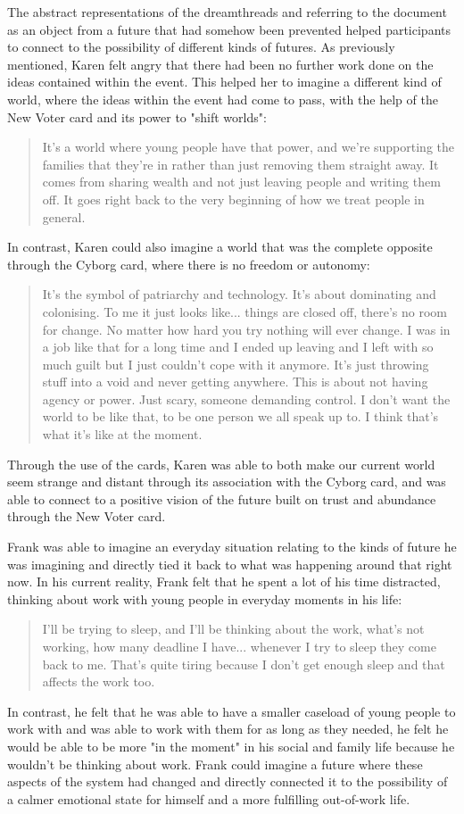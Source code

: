 The abstract representations of the dreamthreads and referring to the document as an object from a future that had somehow been prevented helped participants to connect to the possibility of different kinds of futures. As previously mentioned, Karen felt angry that there had been no further work done on the ideas contained within the event. This helped her to imagine a different kind of world, where the ideas within the event had come to pass, with the help of the New Voter card and its power to "shift worlds":
\begin{quote}
It's a world where young people have that power, and we're supporting the families that they're in rather than just removing them straight away. It comes from sharing wealth and not just leaving people and writing them off. It goes right back to the very beginning of how we treat people in general.
\end{quote}
In contrast, Karen could also imagine a world that was the complete opposite through the Cyborg card, where there is no freedom or autonomy:
\begin{quote}
It's the symbol of patriarchy and technology. It's about dominating and colonising. To me it just looks like... things are closed off, there's no room for change. No matter how hard you try nothing will ever change. I was in a job like that for a long time and I ended up leaving and I left with so much guilt but I just couldn't cope with it anymore. It's just throwing stuff into a void and never getting anywhere. This is about not having agency or power. Just scary, someone demanding control. I don't want the world to be like that, to be one person we all speak up to. I think that's what it's like at the moment.
\end{quote}
Through the use of the cards, Karen was able to both make our current world seem strange and distant through its association with the Cyborg card, and was able to connect to a positive vision of the future built on trust and abundance through the New Voter card.

Frank was able to imagine an everyday situation relating to the kinds of future he was imagining and directly tied it back to what was happening around that right now. In his current reality, Frank felt that he spent a lot of his time distracted, thinking about work with young people in everyday moments in his life:
\begin{quote}
I'll be trying to sleep, and I'll be thinking about the work, what's not working, how many deadline I have... whenever I try to sleep they come back to me. That's quite tiring because I don't get enough sleep and that affects the work too. 
\end{quote}
In contrast, he felt that he was able to have a smaller caseload of young people to work with and was able to work with them for as long as they needed, he felt he would be able to be more "in the moment" in his social and family life because he wouldn't be thinking about work. Frank could imagine a future where these aspects of the system had changed and directly connected it to the possibility of a calmer emotional state for himself and a more fulfilling out-of-work life. 

